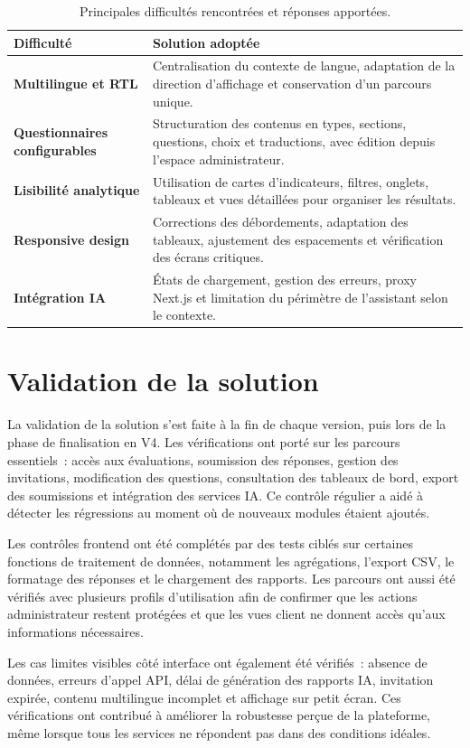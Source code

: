 \documentclass[12pt,a4paper]{report}
\begin{document}
\begin{table}[H]
\centering
\caption{Principales difficultés rencontrées et réponses apportées.}
\begin{tabularx}{\textwidth}{>{\bfseries}L{4cm}Y}
\toprule
Difficulté & Solution adoptée \\
\midrule
Multilingue et RTL & Centralisation du contexte de langue, adaptation de la direction d'affichage et conservation d'un parcours unique. \\
Questionnaires configurables & Structuration des contenus en types, sections, questions, choix et traductions, avec édition depuis l'espace administrateur. \\
Lisibilité analytique & Utilisation de cartes d'indicateurs, filtres, onglets, tableaux et vues détaillées pour organiser les résultats. \\
Responsive design & Corrections des débordements, adaptation des tableaux, ajustement des espacements et vérification des écrans critiques. \\
Intégration IA & États de chargement, gestion des erreurs, proxy Next.js et limitation du périmètre de l'assistant selon le contexte. \\
\bottomrule
\end{tabularx}
\end{table}

\section*{Validation de la solution}
La validation de la solution s'est faite à la fin de chaque version, puis lors de la phase de finalisation en V4. Les vérifications ont porté sur les parcours essentiels~: accès aux évaluations, soumission des réponses, gestion des invitations, modification des questions, consultation des tableaux de bord, export des soumissions et intégration des services IA. Ce contrôle régulier a aidé à détecter les régressions au moment où de nouveaux modules étaient ajoutés.

Les contrôles frontend ont été complétés par des tests ciblés sur certaines fonctions de traitement de données, notamment les agrégations, l'export CSV, le formatage des réponses et le chargement des rapports. Les parcours ont aussi été vérifiés avec plusieurs profils d'utilisation afin de confirmer que les actions administrateur restent protégées et que les vues client ne donnent accès qu'aux informations nécessaires.

Les cas limites visibles côté interface ont également été vérifiés~: absence de données, erreurs d'appel API, délai de génération des rapports IA, invitation expirée, contenu multilingue incomplet et affichage sur petit écran. Ces vérifications ont contribué à améliorer la robustesse perçue de la plateforme, même lorsque tous les services ne répondent pas dans des conditions idéales.
\end{document}
